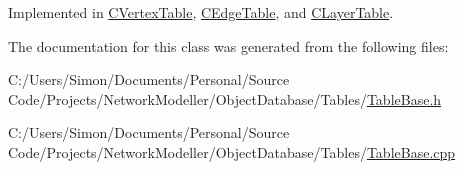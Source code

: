 Implemented in \hyperlink{class_c_vertex_table_aeaea5ff94d8535e89f60e51eeabfc9ae}{C\+Vertex\+Table}, \hyperlink{class_c_edge_table_a9fbb37293645bad4728f1e234b7ce09f}{C\+Edge\+Table}, and \hyperlink{class_c_layer_table_a4f309df5a3c4cbce50aa085ce2d29944}{C\+Layer\+Table}.



The documentation for this class was generated from the following files\+:\begin{DoxyCompactItemize}
\item 
C\+:/\+Users/\+Simon/\+Documents/\+Personal/\+Source Code/\+Projects/\+Network\+Modeller/\+Object\+Database/\+Tables/\hyperlink{_table_base_8h}{Table\+Base.\+h}\item 
C\+:/\+Users/\+Simon/\+Documents/\+Personal/\+Source Code/\+Projects/\+Network\+Modeller/\+Object\+Database/\+Tables/\hyperlink{_table_base_8cpp}{Table\+Base.\+cpp}\end{DoxyCompactItemize}

